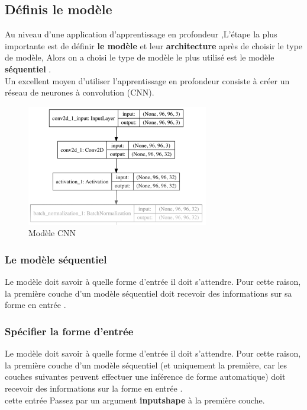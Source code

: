 \documentclass[12pt]{report}
\begin{document}
\subsection{Définis le modèle}
Au niveau d'une application d'apprentissage en profondeur ,L'étape la plus importante est de définir \textbf{le modèle} et leur \textbf{architecture} après de choisir le type de modèle, Alors on a choisi le type de modèle le plus  utilisé est le modèle \textbf{séquentiel} .\\
Un excellent moyen d'utiliser l'apprentissage en profondeur  consiste à créer un réseau de neurones à convolution (CNN). 
\begin{figure}[h]
\begin{center}
\includegraphics[width=300]{cnnmodel.png}
\caption{Modèle CNN}
\end{center}
\end{figure}

\subsubsection{Le modèle séquentiel}
Le modèle doit savoir à quelle forme d'entrée il doit s'attendre. Pour cette raison, la première couche d'un modèle séquentiel doit recevoir des informations sur sa forme en entrée \cite{ref29}.

\subsubsection{Spécifier la forme d'entrée}
Le modèle doit savoir à quelle forme d'entrée il doit s'attendre. Pour cette raison, la première couche d'un modèle séquentiel (et uniquement la première, car les couches suivantes peuvent effectuer une inférence de forme automatique) doit recevoir des informations sur la forme en entrée \cite{ref28} .\\ 
cette entrée Passez par un argument \textbf{inputshape} à la première couche.
\end{document}
